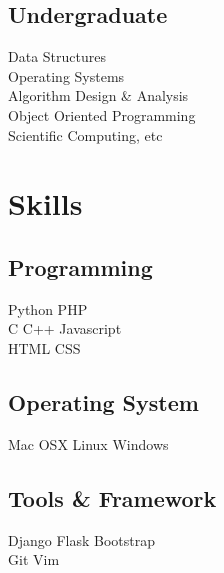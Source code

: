 \documentclass[]{deedy-resume-openfont}
\begin{document}
\begin{minipage}[t]{0.33\textwidth}


\subsection{Undergraduate}
Data Structures \\
Operating Systems \\
Algorithm Design \& Analysis \\
Object Oriented Programming \\
Scientific Computing, etc \\
\sectionsep


\section{Skills}
\subsection{Programming}
Python \textbullet{} PHP \\
C \textbullet{} C++  \textbullet{} Javascript \\ HTML \textbullet{} CSS \textbullet{} \\
\subsection{Operating System}
Mac OSX \textbullet{} Linux \textbullet{} Windows
\subsection{Tools \& Framework}
Django \textbullet Flask \textbullet Bootstrap
\\ Git \textbullet Vim 
\sectionsep


\end{minipage}
\end{document}

